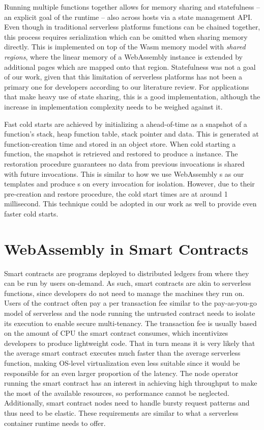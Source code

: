 Running multiple functions together allows for memory sharing and statefulness -- an explicit goal of the runtime --  also across hosts via a state management API. Even though in traditional serverless platforms functions can be chained together, this process requires serialization which can be omitted when sharing memory directly. This is implemented on top of the Wasm memory model with \emph{shared regions}, where the linear memory of a WebAssembly instance is extended by additional pages which are mapped onto that region.
Statefulness was not a goal of our work, given that this limitation of serverless platforms has not been a primary one for developers according to our literature review. For applications that make heavy use of state sharing, this is a good implementation, although the increase in implementation complexity needs to be weighed against it.

Fast cold starts are achieved by initializing a  ahead-of-time as a snapshot of a function's stack, heap function table, stack pointer and data. This is generated at function-creation time and stored in an object store. When cold starting a function, the snapshot is retrieved and restored to produce a  instance. The restoration procedure guarantees no data from previous invocations is shared with future invocations. This is similar to how we use WebAssembly s as our templates and produce s on every invocation for isolation.
However, due to their pre-creation and restore procedure, the cold start times are at around 1 millisecond.
This technique could be adopted in our work as well to provide even faster cold starts.

\section{WebAssembly in Smart Contracts}

Smart contracts are programs deployed to distributed ledgers from where they can be run by users on-demand. As such, smart contracts are akin to serverless functions, since developers do not need to manage the machines they run on. Users of the contract often pay a per transaction fee similar to the pay-as-you-go model of serverless and the node running the untrusted contract needs to isolate its execution to enable secure multi-tenancy.
The transaction fee is usually based on the amount of CPU the smart contract consumes, which incentivizes developers to produce lightweight code. That in turn means it is very likely that the average smart contract executes much faster than the average serverless function, making OS-level virtualization even less suitable since it would be responsible for an even larger proportion of the latency. The node operator running the smart contract has an interest in achieving high throughput to make the most of the available resources, so performance cannot be neglected. Additionally, smart contract nodes need to handle bursty request patterns and thus need to be elastic.
These requirements are similar to what a serverless container runtime needs to offer.

